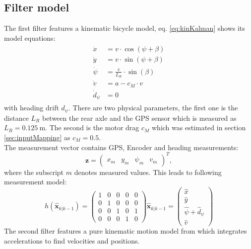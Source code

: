 \subsection{Filter model}
The first filter features a kinematic bicycle model, eq. \eqref{eq:kinKalman} shows its model equations:
\begin{align}
\begin{split}\label{eq:kinKalman}
    \dot x &= v \cdot \cos (\psi + \beta)\\
    \dot y &= v \cdot \sin (\psi + \beta)\\
    \dot \psi &= \frac{v}{L_R}\cdot\sin(\beta)\\
    \dot v &= a - c_M\cdot v\\
    \dot d_\psi &= 0
\end{split}
\end{align}
with heading drift $d_\psi$.
There are two physical parameters, the first one is the distance $L_R$ between the rear axle and the GPS sensor which is measured as $L_R=\SI{0.125}{\meter}$. The second is the motor drag $c_M$ which was estimated in section \ref{sec:inputMapping} as $c_M=0.5$.\\
The measurement vector contains GPS, Encoder and heading measurements:
\begin{equation}
\bm{z} = \begin{pmatrix}
x_m&y_m&\psi_m&v_m
\end{pmatrix}^T,
\end{equation}
where the subscript $m$ denotes measured values. This leads to following measurement model:
\begin{equation}
h(\hat{\bm{x}}_{k|k-1}) = \begin{pmatrix}
1 & 0 & 0 & 0 & 0\\
0 & 1 & 0 & 0 & 0\\
0 & 0 & 1 & 0 & 1\\
0 & 0 & 0 & 1 & 0
\end{pmatrix} \hat{\bm{x}}_{k|k-1}=
\begin{pmatrix}
\hat x\\
\hat y\\
\hat \psi + \hat d_\psi\\
\hat v
\end{pmatrix}
\end{equation} 
The second filter features a pure kinematic motion model from \cite{Caron2006} which integrates accelerations to find velocities and positions.

